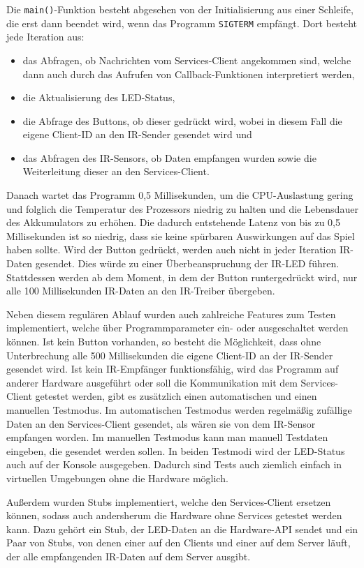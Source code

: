 Die \texttt{main()}-Funktion besteht abgesehen von der Initialisierung aus einer Schleife, die erst
dann beendet wird, wenn das Programm \texttt{SIGTERM} empfängt.
Dort besteht jede Iteration aus:
\begin{itemize}
  \item
    das Abfragen, ob Nachrichten vom Services-Client angekommen sind, welche dann auch durch das
    Aufrufen von Callback-Funktionen interpretiert werden,
  \item
    die Aktualisierung des LED-Status,
  \item
    die Abfrage des Buttons, ob dieser gedrückt wird, wobei in diesem Fall die eigene Client-ID an
    den IR-Sender gesendet wird und
  \item
    das Abfragen des IR-Sensors, ob Daten empfangen wurden sowie die Weiterleitung dieser an den
    Services-Client.
\end{itemize}
Danach wartet das Programm 0,5 Millisekunden, um die CPU-Auslastung gering und folglich die
Temperatur des Prozessors niedrig zu halten und die Lebensdauer des Akkumulators zu erhöhen.
Die dadurch entstehende Latenz von bis zu 0,5 Millisekunden ist so niedrig, dass sie keine spürbaren
Auswirkungen auf das Spiel haben sollte.
Wird der Button gedrückt, werden auch nicht in jeder Iteration IR-Daten gesendet.
Dies würde zu einer Überbeanspruchung der IR-LED führen.
Stattdessen werden ab dem Moment, in dem der Button runtergedrückt wird, nur alle 100 Millisekunden
IR-Daten an den IR-Treiber übergeben.

Neben diesem regulären Ablauf wurden auch zahlreiche Features zum Testen implementiert, welche über
Programmparameter ein- oder ausgeschaltet werden können.
Ist kein Button vorhanden, so besteht die Möglichkeit, dass ohne Unterbrechung alle 500
Millisekunden die eigene Client-ID an der IR-Sender gesendet wird.
Ist kein IR-Empfänger funktionsfähig, wird das Programm auf anderer Hardware ausgeführt oder soll
die Kommunikation mit dem Services-Client getestet werden, gibt es zusätzlich einen automatischen
und einen manuellen Testmodus.
Im automatischen Testmodus werden regelmäßig zufällige Daten an den Services-Client gesendet, als
wären sie von dem IR-Sensor empfangen worden.
Im manuellen Testmodus kann man manuell Testdaten eingeben, die gesendet werden sollen.
In beiden Testmodi wird der LED-Status auch auf der Konsole ausgegeben.
Dadurch sind Tests auch ziemlich einfach in virtuellen Umgebungen ohne die Hardware möglich.

Außerdem wurden Stubs implementiert, welche den Services-Client ersetzen können, sodass auch
andersherum die Hardware ohne Services getestet werden kann.
Dazu gehört ein Stub, der LED-Daten an die Hardware-API sendet und ein Paar von Stubs, von denen
einer auf den Clients und einer auf dem Server läuft, der alle empfangenden IR-Daten auf dem Server
ausgibt.

